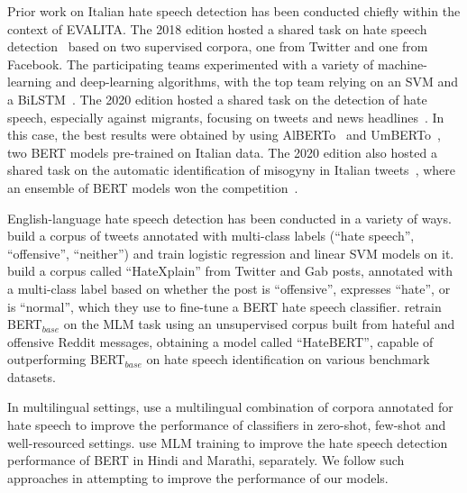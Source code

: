 \documentclass[11pt]{article}
\newcommand{\todoA}[1]{\todo[color=blue!40]{A: #1}}
\newcommand{\albert}{\mbox{AlBERTo}}
\begin{document}
Prior work on Italian hate speech detection has been conducted chiefly within the context of EVALITA\@. The 2018 edition hosted a shared task on hate speech detection~\cite{boscoOverviewEVALITA2018} based on two supervised corpora, one from Twitter and one from Facebook. The participating teams experimented with a variety of machine-learning and deep-learning algorithms, with the top team relying on an SVM and a BiLSTM~\cite{cimino2018multi}. The 2020 edition hosted a shared task on the detection of hate speech, especially against migrants, focusing on tweets and news headlines~\cite{basileEVALITA2020Overview}. In this case, the best results were obtained by using AlBERTo~\cite{PolignanoEtAlCLIC2019} and UmBERTo~\cite{musixmatch-2020-umberto}, two BERT models pre-trained on Italian data. The 2020 edition also hosted a shared task on the automatic identification of misogyny in Italian tweets~\cite{fersiniAMIEVALITA2020Automatic2020}, where an ensemble of BERT models won the competition~\cite{mutiUniBOAMIMultiClass2020}.

English-language hate speech detection has been conducted in a variety of ways.  build a corpus of tweets annotated with multi-class labels (``hate speech'', ``offensive'', ``neither'') and train logistic regression and linear SVM models on it.
 build a corpus called ``HateXplain'' from Twitter and Gab posts, annotated with a multi-class label based on whether the post is ``offensive'', expresses ``hate'', or is ``normal'', which they use to fine-tune a BERT hate speech classifier.
 retrain BERT$_{base}$ on the MLM task using an unsupervised corpus built from hateful and offensive Reddit messages, obtaining a model called ``HateBERT'', capable of outperforming BERT$_{base}$ on hate speech identification on various benchmark datasets.

In multilingual settings,  use a multilingual combination of corpora annotated for hate speech to improve the performance of classifiers in zero-shot, few-shot and well-resourced settings.  use MLM training to improve the hate speech detection performance of BERT in Hindi and Marathi, separately. We follow such approaches in attempting to improve the performance of our models.

\end{document}
